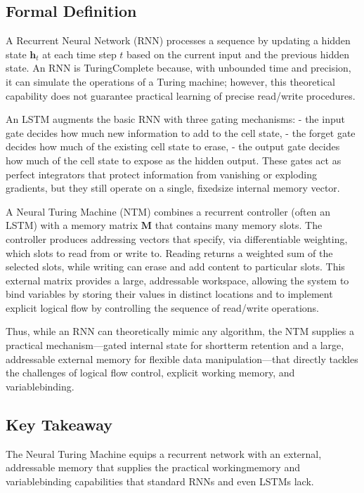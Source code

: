 \documentclass[12pt, a4paper]{article}
\begin{document}
\subsection{Formal Definition}
A Recurrent Neural Network (RNN) processes a sequence by updating a hidden state \(\mathbf{h}_t\) at each time step \(t\) based on the current input and the previous hidden state. An RNN is TuringComplete because, with unbounded time and precision, it can simulate the operations of a Turing machine; however, this theoretical capability does not guarantee practical learning of precise read/write procedures.  

An LSTM augments the basic RNN with three gating mechanisms:
- the input gate decides how much new information to add to the cell state,
- the forget gate decides how much of the existing cell state to erase,
- the output gate decides how much of the cell state to expose as the hidden output.  
These gates act as perfect integrators that protect information from vanishing or exploding gradients, but they still operate on a single, fixedsize internal memory vector.  

A Neural Turing Machine (NTM) combines a recurrent controller (often an LSTM) with a memory matrix \(\mathbf{M}\) that contains many memory slots. The controller produces addressing vectors that specify, via differentiable weighting, which slots to read from or write to. Reading returns a weighted sum of the selected slots, while writing can erase and add content to particular slots. This external matrix provides a large, addressable workspace, allowing the system to bind variables by storing their values in distinct locations and to implement explicit logical flow by controlling the sequence of read/write operations.  

Thus, while an RNN can theoretically mimic any algorithm, the NTM supplies a practical mechanism---gated internal state for shortterm retention and a large, addressable external memory for flexible data manipulation---that directly tackles the challenges of logical flow control, explicit working memory, and variablebinding.

\subsection{Key Takeaway}
The Neural Turing Machine equips a recurrent network with an external, addressable memory that supplies the practical workingmemory and variablebinding capabilities that standard RNNs and even LSTMs lack.
\end{document}
